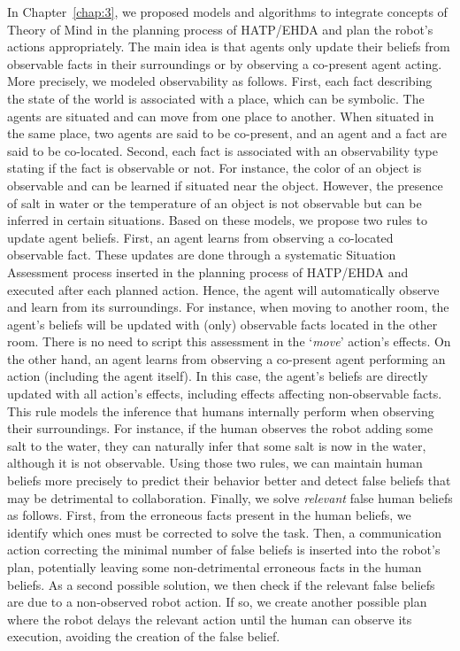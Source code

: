 In Chapter~\ref{chap:3}, we proposed models and algorithms to integrate concepts of Theory of Mind in the planning process of HATP/EHDA and plan the robot's actions appropriately. 
The main idea is that agents only update their beliefs from observable facts in their surroundings or by observing a co-present agent acting. 
More precisely, we modeled observability as follows. First, each fact describing the state of the world is associated with a place, which can be symbolic. The agents are situated and can move from one place to another. When situated in the same place, two agents are said to be co-present, and an agent and a fact are said to be co-located. Second, each fact is associated with an observability type stating if the fact is observable or not. For instance, the color of an object is observable and can be learned if situated near the object. However, the presence of salt in water or the temperature of an object is not observable but can be inferred in certain situations.
Based on these models, we propose two rules to update agent beliefs. First, an agent learns from observing a co-located observable fact. These updates are done through a systematic Situation Assessment process inserted in the planning process of HATP/EHDA and executed after each planned action. Hence, the agent will automatically observe and learn from its surroundings. For instance, when moving to another room, the agent's beliefs will be updated with (only) observable facts located in the other room.  There is no need to script this assessment in the `\textit{move}' action's effects. On the other hand, an agent learns from observing a co-present agent performing an action (including the agent itself). In this case, the agent's beliefs are directly updated with all action's effects, including effects affecting non-observable facts. This rule models the inference that humans internally perform when observing their surroundings. For instance, if the human observes the robot adding some salt to the water, they can naturally infer that some salt is now in the water, although it is not observable.
Using those two rules, we can maintain human beliefs more precisely to predict their behavior better and detect false beliefs that may be detrimental to collaboration. Finally, we solve \textit{relevant} false human beliefs as follows. First, from the erroneous facts present in the human beliefs, we identify which ones must be corrected to solve the task. Then, a communication action correcting the minimal number of false beliefs is inserted into the robot's plan, potentially leaving some non-detrimental erroneous facts in the human beliefs. As a second possible solution, we then check if the relevant false beliefs are due to a non-observed robot action. If so, we create another possible plan where the robot delays the relevant action until the human can observe its execution, avoiding the creation of the false belief. 
